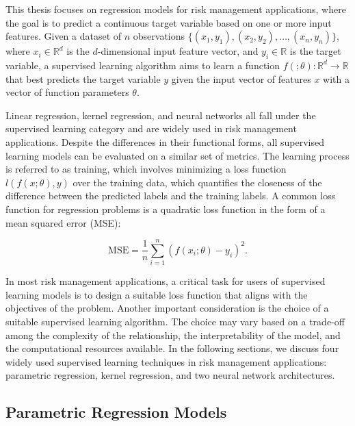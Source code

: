 This thesis focuses on regression models for risk management applications, where the goal is to predict a continuous target variable based on one or more input features.
Given a dataset of $n$ observations $\{(x_1, y_1), (x_2, y_2), \ldots, (x_n, y_n)\}$, where $x_i \in \mathbb{R}^d$ is the $d$-dimensional input feature vector, and $y_i \in \mathbb{R}$ is the target variable, a supervised learning algorithm aims to learn a function $f(;\theta): \mathbb{R}^d \rightarrow \mathbb{R}$ that best predicts the target variable $y$ given the input vector of features $x$ with a vector of function parameters $\theta$.

Linear regression, kernel regression, and neural networks all fall under the supervised learning category and are widely used in risk management applications.
Despite the differences in their functional forms, all supervised learning models can be evaluated on a similar set of metrics.
The learning process is referred to as training, which involves minimizing a loss function $l(f(x; \theta),y)$ over the training data, which quantifies the closeness of the difference between the predicted labels and the training labels.
A common loss function for regression problems is a quadratic loss function in the form of a mean squared error (MSE):

\begin{equation} \label{eq:mse}
    \text{MSE} = \frac{1}{n} \sum_{i=1}^{n} (f(x_i;\theta) - y_i)^2.
\end{equation}

In most risk management applications, a critical task for users of supervised learning models is to design a suitable loss function that aligns with the objectives of the problem.
Another important consideration is the choice of a suitable supervised learning algorithm.
The choice may vary based on a trade-off among the complexity of the relationship, the interpretability of the model, and the computational resources available.
In the following sections, we discuss four widely used supervised learning techniques in risk management applications: parametric regression, kernel regression, and two neural network architectures.

\subsection{Parametric Regression Models}

